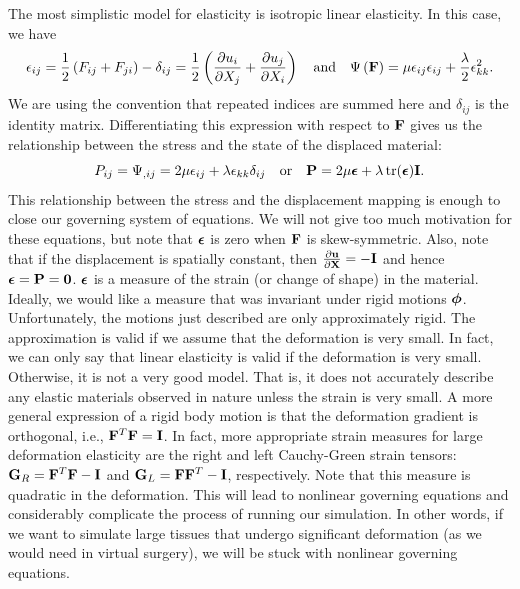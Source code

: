 The most simplistic model for elasticity is isotropic linear elasticity. In this case, we have
\begin{equation*}
\epsilon_{ij} = \frac{1}{2} \left( F_{ij} + F_{ji} \right) - \delta_{ij} = \frac{1}{2} \left( \frac{\partial u_i}{\partial X_j} + \frac{\partial u_j}{\partial X_i} \right) \quad \text{and} \quad \Psi \left( \mathbf{F} \right) = \mu \epsilon_{ij} \epsilon_{ij} + \frac{\lambda}{2} \epsilon_{kk}^2.
\end{equation*}
We are using the convention that repeated indices are summed here and $\delta_{ij}$ is the identity matrix. Differentiating this expression with respect to $\mathbf{F}$ gives us the relationship between the stress and the state of the displaced material:
\begin{equation*}
P_{ij} = \Psi_{,ij} = 2 \mu \epsilon_{ij} + \lambda \epsilon_{kk} \delta_{ij} \quad \text{or} \quad \mathbf{P} = 2 \mu \boldsymbol{\epsilon} + \lambda \operatorname{tr}(\boldsymbol{\epsilon}) \mathbf{I}.
\end{equation*}
This relationship between the stress and the displacement mapping is enough to close our governing system of equations. We will not give too much motivation for these equations, but note that $\boldsymbol{\epsilon}$ is zero when $\mathbf{F}$ is skew-symmetric. Also, note that if the displacement is spatially constant, then $\frac{\partial\mathbf{u}}{\partial\mathbf{X}} = -\mathbf{I}$ and hence $\boldsymbol{\epsilon} = \mathbf{P} = \mathbf{0}$. $\boldsymbol{\epsilon}$ is a measure of the strain (or change of shape) in the material. Ideally, we would like a measure that was invariant under rigid motions $\boldsymbol{\phi}$. Unfortunately, the motions just described are only approximately rigid. The approximation is valid if we assume that the deformation is very small. In fact, we can only say that linear elasticity is valid if the deformation is very small. Otherwise, it is not a very good model. That is, it does not accurately describe any elastic materials observed in nature unless the strain is very small. A more general expression of a rigid body motion is that the deformation gradient is orthogonal, i.e., $\mathbf{F}^T \mathbf{F} = \mathbf{I}$. In fact, more appropriate strain measures for large deformation elasticity are the right and left Cauchy-Green strain tensors: $\mathbf{G}_R = \mathbf{F}^T \mathbf{F} - \mathbf{I}$ and  $\mathbf{G}_L = \mathbf{F} \mathbf{F}^T - \mathbf{I}$, respectively. Note that this measure is quadratic in the deformation. This will lead to nonlinear governing equations and considerably complicate the process of running our simulation. In other words, if we want to simulate large tissues that undergo significant deformation (as we would need in virtual surgery), we will be stuck with nonlinear governing equations.

